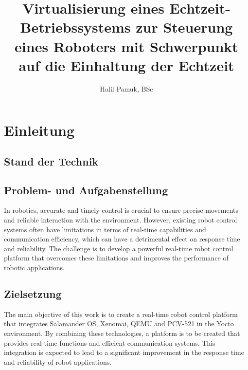 \documentclass[MMR,Master,english]{twbook}
\title{Virtualisierung eines Echtzeit-Betriebssystems zur Steuerung eines Roboters mit Schwerpunkt auf die
Einhaltung der Echtzeit}
\author{Halil Pamuk, BSc}
\begin{document}
\maketitle

%
%
%


\chapter{Einleitung}
\blindmathpaper
\clearpage
\section{Stand der Technik}
\blindtext
\clearpage
\section{Problem- und Aufgabenstellung}
In robotics, accurate and timely control is crucial to ensure precise movements and reliable interaction with the environment. However, existing robot control systems often have limitations in terms of real-time capabilities and communication efficiency, which can have a detrimental effect on response time and reliability. The challenge is to develop a powerful real-time robot control platform that overcomes these limitations and improves the performance of robotic applications.


\clearpage
\section{Zielsetzung}

The main objective of this work is to create a real-time robot control platform that integrates Salamander OS, Xenomai, QEMU and PCV-521 in the Yocto environment. By combining these technologies, a platform is to be created that provides real-time functions and efficient communication systems. This integration is expected to lead to a significant improvement in the response time and reliability of robot applications.
\end{document}
